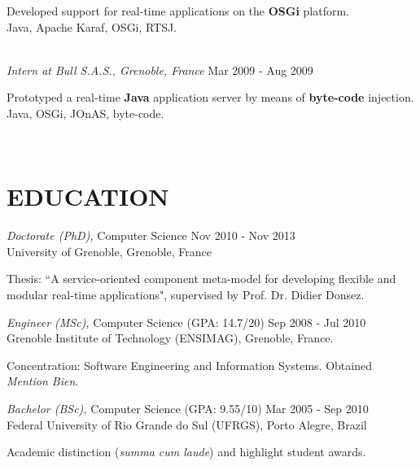 \documentclass[margin]{res}
\begin{document}
\begin{resume}
\begin{small}
                 		{\color{darkgray} Developed support for real-time applications on the \textbf{OSGi} platform.}\\
				{\color{gray}Java, Apache Karaf, OSGi, RTSJ.}
	                 \end{small}
			\vspace{1mm}\\                 
                		{\sl Intern at Bull S.A.S., Grenoble, France} \hfill Mar 2009 - Aug 2009 \\
	                \begin{small}
                			{\color{darkgray} Prototyped a real-time \textbf{Java} application server by means of \textbf{byte-code} injection.}\\
				{\color{gray}Java, OSGi, JOnAS, byte-code.}
        		        \end{small}
                		\vspace{1mm}\\                 
		\vspace{-8mm}
		\section{EDUCATION} {\sl Doctorate (PhD),} Computer Science \hfill Nov 2010 - Nov 2013\\
               		University of Grenoble, Grenoble, France\\
	   		\begin{small}
        	        			{\color{darkgray} Thesis: ``A service-oriented component meta-model for developing flexible and modular real-time applications", supervised by Prof. Dr. Didier Donsez.}
				\vspace{1.5mm}\\                 	            
			\end{small}  	            
        		        {\sl Engineer (MSc),} Computer Science (GPA: 14.7/20) \hfill Sep 2008 - Jul 2010\\
               		Grenoble Institute of Technology (ENSIMAG), Grenoble, France.\\
	               	 \begin{small}
        		       		{\color{darkgray} Concentration: Software Engineering and Information Systems. Obtained \textit{Mention Bien}.}
				\vspace{1.5mm}\\
	               	\end{small}
        		        {\sl Bachelor (BSc),} Computer Science (GPA: 9.55/10) \hfill Mar 2005 - Sep 2010\\
                		Federal University of Rio Grande do Sul (UFRGS), Porto Alegre, Brazil\\
	               	\begin{small}
        		       		{\color{darkgray} Academic distinction (\textit{summa cum laude}) and highlight student awards.}
				\vspace{1.5mm}\\
	               	\end{small}
		\vspace{-8mm}

\end{resume}
\end{document}
